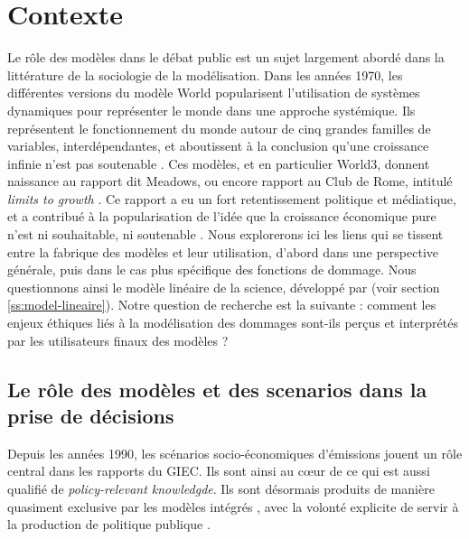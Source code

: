 


\section{Contexte}

Le rôle des modèles dans le débat public est un sujet largement abordé dans la littérature de la sociologie de la modélisation. Dans les années 1970, les différentes versions du modèle World popularisent l'utilisation de systèmes dynamiques pour représenter le monde dans une approche systémique. Ils représentent le fonctionnement du monde autour de cinq grandes familles de variables, interdépendantes, et aboutissent à la conclusion qu'une croissance infinie n'est pas soutenable \autocite{forrester_world_1971}.  Ces modèles, et en particulier World3, donnent naissance au rapport dit Meadows, ou encore rapport au Club de Rome, intitulé \emph{limits to growth} \autocite{meadows_limits_1972}. Ce rapport a eu un fort retentissement politique et médiatique, et a contribué à la popularisation de l'idée que la croissance économique pure n'est ni souhaitable, ni soutenable \autocite{edwards_global_1996}. 
Nous explorerons ici les liens qui se tissent entre la fabrique des modèles et leur utilisation, d'abord dans une perspective générale, puis dans le cas plus spécifique des fonctions de dommage. Nous questionnons ainsi le modèle linéaire de la science, développé par \textcite{aykut_gouverner_2015} (voir section \ref{ss:model-lineaire}). Notre question de recherche est la suivante : comment les enjeux éthiques liés à la modélisation des dommages sont-ils perçus et interprétés par les utilisateurs finaux des modèles ? 

\subsection{Le rôle des modèles et des scenarios dans la prise de décisions}

Depuis les années 1990, les scénarios socio-économiques d'émissions jouent un rôle central dans les rapports du GIEC. Ils sont ainsi au cœur de ce qui est aussi qualifié de \emph{policy-relevant knowledgde}. Ils sont désormais produits de manière quasiment exclusive par les modèles intégrés \autocite{cointe_organising_2019}, avec la volonté explicite de servir à la production de politique publique \autocite{weyant_integrated_1995}. \\



